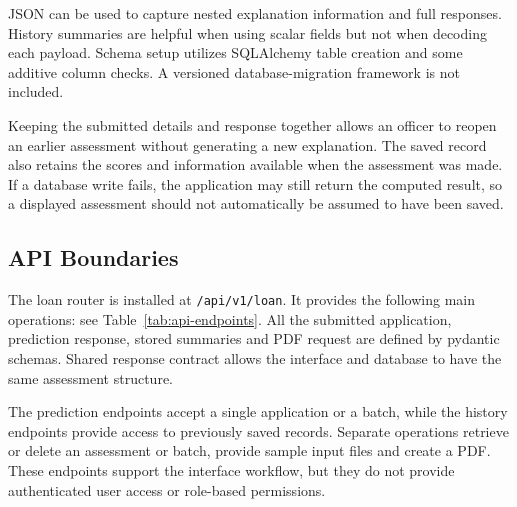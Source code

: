 JSON can be used to capture nested explanation information and full responses. History summaries are helpful when using scalar fields but not when decoding each payload. Schema setup utilizes SQLAlchemy table creation and some additive column checks. A versioned database-migration framework is not included.

Keeping the submitted details and response together allows an officer to reopen an earlier assessment without generating a new explanation. The saved record also retains the scores and information available when the assessment was made. If a database write fails, the application may still return the computed result, so a displayed assessment should not automatically be assumed to have been saved.

\clearpage
\subsection{API Boundaries}
The loan router is installed at \texttt{/api/v1/loan}. It provides the following main operations: see Table~\ref{tab:api-endpoints}. All the submitted application, prediction response, stored summaries and PDF request are defined by pydantic schemas. Shared response contract allows the interface and database to have the same assessment structure.

The prediction endpoints accept a single application or a batch, while the history endpoints provide access to previously saved records. Separate operations retrieve or delete an assessment or batch, provide sample input files and create a PDF. These endpoints support the interface workflow, but they do not provide authenticated user access or role-based permissions.

